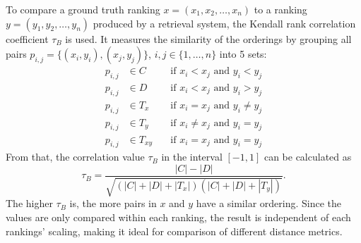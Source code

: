 To compare a ground truth ranking $x = (x_1, x_2, \dots, x_n)$ to a ranking
$y = (y_1, y_2, \dots, y_n)$ produced by a retrieval system, the Kendall
rank correlation coefficient $\tau_B$ is used. It measures the similarity of
the orderings by grouping all pairs $p_{i, j} = \{(x_i, y_i), (x_j, y_j)\}$,
$i, j \in \{1, \dots, n\}$ into 5 sets:
\begin{align*}
    p_{i, j} & \in C & \quad\text{if } x_i < x_j \text{ and } y_i < y_j \\
    p_{i, j} & \in D & \quad\text{if } x_i < x_j \text{ and } y_i > y_j \\
    p_{i, j} & \in T_x & \quad\text{if } x_i = x_j \text{ and } y_i \neq y_j \\
    p_{i, j} & \in T_y & \quad\text{if } x_i \neq x_j \text{ and } y_i = y_j \\
    p_{i, j} & \in T_{xy} & \quad\text{if } x_i = x_j \text{ and } y_i = y_j
\end{align*}
From that, the correlation value $\tau_B$ in the interval $[-1, 1]$ can be
calculated as
\begin{equation*}
    \tau_B = \frac{|C| - |D|}{\sqrt{(|C| + |D| + |T_x|)(|C| + |D| + |T_y|)}}.
\end{equation*}
The higher $\tau_B$ is, the more pairs in $x$ and $y$ have a similar ordering.
Since the values are only compared within each ranking, the result is
independent of each rankings' scaling, making it ideal for comparison of
different distance metrics.
